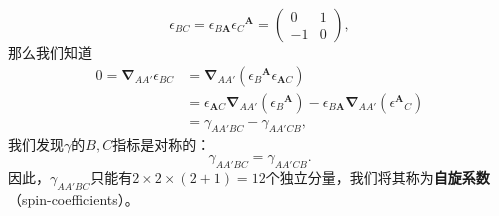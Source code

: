 \begin{equation}
	\epsilon _{BC} =\epsilon _{B\boldsymbol{A}} \epsilon {_{C}}^{\boldsymbol{A}} =\begin{pmatrix}
		0 & 1\\
		-1 & 0
	\end{pmatrix} ,
	\label{eq:5.43}
\end{equation}
那么我们知道
\begin{equation*}
	\begin{aligned}
		0=\mathbf{\nabla }_{AA'} \epsilon _{BC} & =\mathbf{\nabla }_{AA'} (\epsilon {_{B}}^{\boldsymbol{A}} \epsilon _{\boldsymbol{A} C} )\\
		& =\epsilon _{\boldsymbol{A} C}\mathbf{\nabla }_{AA'} (\epsilon {_{B}}^{\boldsymbol{A}} )-\epsilon _{B\boldsymbol{A}}\mathbf{\nabla }_{AA'} (\epsilon ^{\boldsymbol{A}}{}_{C} )\\
		& =\gamma _{AA'BC} -\gamma _{AA'CB} ,
	\end{aligned}
\end{equation*}
我们发现$\gamma $的$B,C$指标是对称的：
\begin{equation}
	\gamma _{AA'BC} =\gamma _{AA'CB} .
	\label{eq:5.44}
\end{equation}
因此，$\gamma _{AA'BC}$只能有$2\times 2\times ( 2+1) =12$个独立分量，我们将其称为\textbf{自旋系数}（spin-coefficients）。



